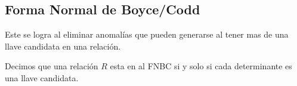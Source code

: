 \documentclass[12pt, fleqn]{report}                             %
\begin{document}
            \clearpage
            \subsection{Forma Normal de Boyce/Codd}

                Este se logra al eliminar anomalías que pueden generarse al tener mas de una
                llave candidata en una relación.

                Decimos que una relación $R$ esta en al FNBC si y solo si
                cada determinante es una llave candidata.

                \vspace{3em}
\end{document}
